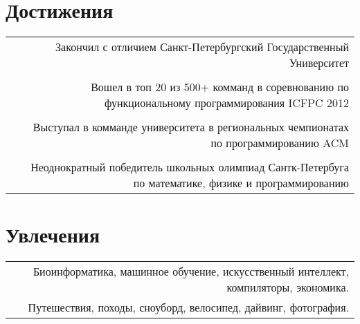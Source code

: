 \documentclass[10pt]{article}
\begin{document}
\section*{Достижения}
\begin{tabular}{L R}
& Закончил с отличием Санкт-Петербургский Государственный Университет\\
& \\
& Вошел в топ 20 из 500+ комманд в соревнованию по функциональному программирования ICFPC 2012\\
& \\
& Выступал в комманде университета в региональных чемпионатах по программированию ACM \\
& \\
&  Неоднократный победитель школьных олимпиад Сантк-Петербуга по математике, физике и программированию
\end{tabular}

\section*{Увлечения}
\begin{tabular}{L R}
	& Биоинформатика, машинное обучение, искусственный интеллект, компиляторы, экономика.\\
	& Путешествия, походы, сноуборд, велосипед, дайвинг, фотография.\\
\end{tabular}
 
\end{document}
